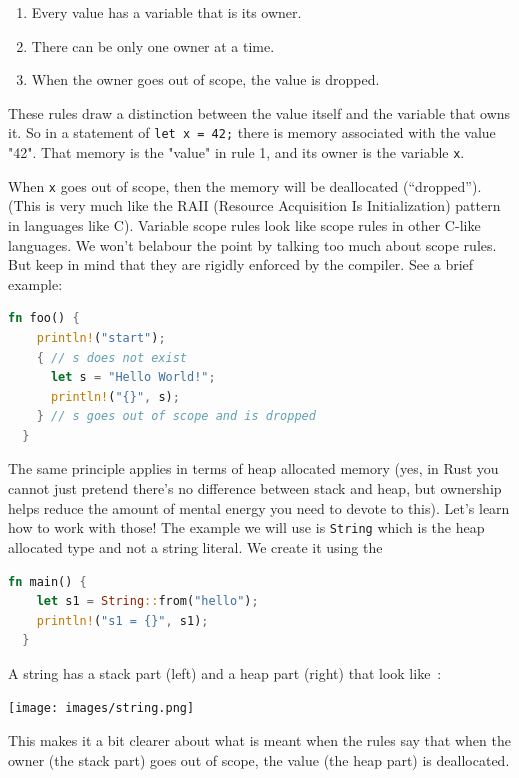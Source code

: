 \documentclass[a4paper]{report}
\newcommand{\CPP}{C\nolinebreak\hspace{-.05em}\raisebox{.4ex}{\tiny\bf +}\nolinebreak\hspace{-.10em}\raisebox{.4ex}{\tiny\bf +}}
\def\CPP{{C\nolinebreak[4]\hspace{-.05em}\raisebox{.4ex}{\tiny\bf ++}}}
\begin{document}
\begin{enumerate}
	\item Every value has a variable that is its owner.
	\item There can be only one owner at a time.
	\item When the owner goes out of scope, the value is dropped.
\end{enumerate}

These rules draw a distinction between the value itself and the variable that owns it. So in a statement of \texttt{let x = 42;} there is memory associated with the value "42". That memory is the "value" in rule 1, and its owner is the variable \texttt{x}.

When \texttt{x} goes out of scope, then the memory will be deallocated (``dropped''). (This is very much like the RAII (Resource Acquisition Is Initialization) pattern in languages like \CPP). Variable scope rules look like scope rules in other C-like languages. We won't belabour the point by talking too much about scope rules. But keep in mind that they are rigidly enforced by the compiler. See a brief example:
\begin{lstlisting}[language=Rust]
  fn foo() {
    println!("start");
    { // s does not exist
      let s = "Hello World!";
      println!("{}", s);
    } // s goes out of scope and is dropped
  }
\end{lstlisting}

The same principle applies in terms of heap allocated memory (yes, in Rust you cannot just pretend there's no difference between stack and heap, but ownership helps reduce the amount of mental energy you need to devote to this). Let's learn how to work with those! The example we will use is \texttt{String} which is the heap allocated type and not a string literal. We create it using the 
\begin{lstlisting}[language=Rust]
  fn main() {
    let s1 = String::from("hello");
    println!("s1 = {}", s1);
  }
\end{lstlisting}

A string has a stack part (left) and a heap part (right) that look like~\cite{rustdocs}:
\begin{center}
\texttt{[image: images/string.png]} 
\end{center}

This makes it a bit clearer about what is meant when the rules say that when the owner (the stack part) goes out of scope, the value (the heap part) is deallocated.
\end{document}
